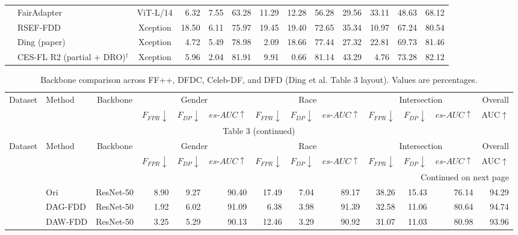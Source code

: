 \documentclass[9pt]{article}
\begin{document}
\begin{landscape}
\begin{longtable}{llc|rrr|rrr|rrr|r}
 & FairAdapter & ViT-L/14 & 6.32 & 7.55 & 63.28 & 11.29 & 12.28 & 56.28 & 29.56 & 33.11 & 48.63 & 68.12\\
 & RSEF-FDD & Xception & 18.50 & 6.11 & 75.97 & 19.45 & 19.40 & 72.65 & 35.34 & 10.97 & 67.24 & 80.54\\
 & Ding (paper) & Xception & 4.72 & 5.49 & 78.98 & 2.09 & 18.66 & 77.44 & 27.32 & 22.81 & 69.73 & 81.46\\
\rowcolor{blue!8} & CES-FL R2 (partial + DRO)$^{\dagger}$ & Xception & 5.96 & 2.04 & 81.91 & 9.91 & 0.66 & 81.14 & 43.29 & 4.76 & 73.28 & 82.12\\
\midrule
\end{longtable}\end{landscape}
\begin{landscape}\tiny\setlength{\tabcolsep}{3pt}\begin{longtable}{llc|rrr|rrr|rrr|r}
\caption{Backbone comparison across FF++, DFDC, Celeb-DF, and DFD (Ding et al. Table 3 layout). Values are percentages.}\label{tab:table3}\\
\toprule Dataset & Method & Backbone & \multicolumn{3}{c|}{Gender} & \multicolumn{3}{c|}{Race} & \multicolumn{3}{c|}{Intersection} & Overall\\
& & & $F_{FPR}\downarrow$ & $F_{DP}\downarrow$ & $es\text{-}AUC\uparrow$ & $F_{FPR}\downarrow$ & $F_{DP}\downarrow$ & $es\text{-}AUC\uparrow$ & $F_{FPR}\downarrow$ & $F_{DP}\downarrow$ & $es\text{-}AUC\uparrow$ & AUC$\uparrow$\\\midrule\endfirsthead
\multicolumn{13}{c}{Table 3 (continued)}\\\toprule Dataset & Method & Backbone & \multicolumn{3}{c|}{Gender} & \multicolumn{3}{c|}{Race} & \multicolumn{3}{c|}{Intersection} & Overall\\
& & & $F_{FPR}\downarrow$ & $F_{DP}\downarrow$ & $es\text{-}AUC\uparrow$ & $F_{FPR}\downarrow$ & $F_{DP}\downarrow$ & $es\text{-}AUC\uparrow$ & $F_{FPR}\downarrow$ & $F_{DP}\downarrow$ & $es\text{-}AUC\uparrow$ & AUC$\uparrow$\\\midrule\endhead
\midrule\multicolumn{13}{r}{Continued on next page}\\\endfoot\bottomrule\endlastfoot
\multirow{6}{*}{FF++} & Ori & ResNet-50 & 8.90 & 9.27 & 90.40 & 17.49 & 7.04 & 89.17 & 38.26 & 15.43 & 76.14 & 94.29\\
 & DAG-FDD & ResNet-50 & 1.92 & 6.02 & 91.09 & 6.38 & 3.98 & 91.39 & 32.58 & 11.06 & 80.64 & 94.74\\
 & DAW-FDD & ResNet-50 & 3.25 & 5.29 & 90.13 & 12.46 & 3.29 & 90.92 & 31.07 & 11.03 & 80.98 & 93.96\\

\end{longtable}
\end{landscape}
\end{document}
